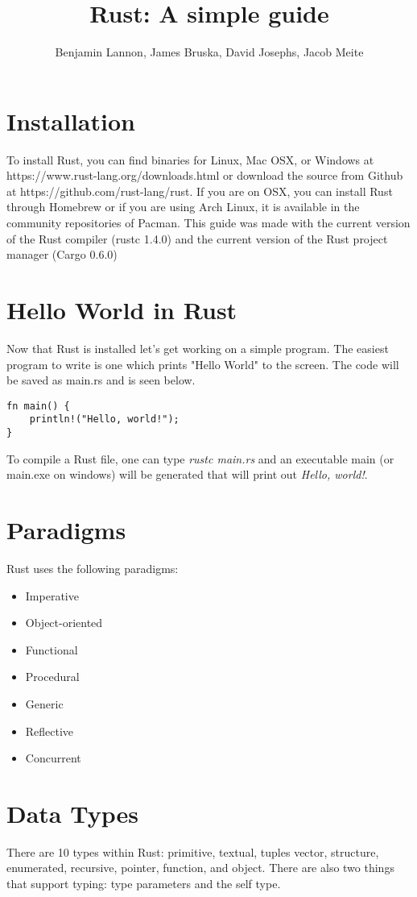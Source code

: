 \documentclass{article}
\title{Rust: A simple guide}
\author{Benjamin Lannon, James Bruska, David Josephs, Jacob Meite}
\begin{document}
\maketitle
\tableofcontents

\section{Installation}
To install Rust, you can find binaries for Linux, Mac OSX, or Windows at https://www.rust-lang.org/downloads.html or download the source from Github at https://github.com/rust-lang/rust. If you are on OSX, you can install Rust through Homebrew or if you are using Arch Linux, it is available in the community repositories of Pacman. This guide was made with the current version of the Rust compiler (rustc 1.4.0) and the current version of the Rust project manager (Cargo 0.6.0)

\section{Hello World in Rust}
Now that Rust is installed let's get working on a simple program. The easiest program to write is one which prints "Hello World" to the screen. The code will be saved as main.rs and is seen below.
\begin{lstlisting}
fn main() {
	println!("Hello, world!");
}
\end{lstlisting}

To compile a Rust file, one can type \emph{rustc main.rs} and an executable main (or main.exe on windows) will be generated that will print out \emph{Hello, world!}.

\section{Paradigms}
Rust uses the following paradigms:
\begin{itemize}
\item Imperative
\item Object-oriented
\item Functional
\item Procedural
\item Generic
\item Reflective
\item Concurrent
\end{itemize}

\section{Data Types}
There are 10 types within Rust: primitive, textual, tuples vector, structure, enumerated, recursive, pointer, function, and object. There are also two things that support typing: type parameters and the self type.
\end{document}
